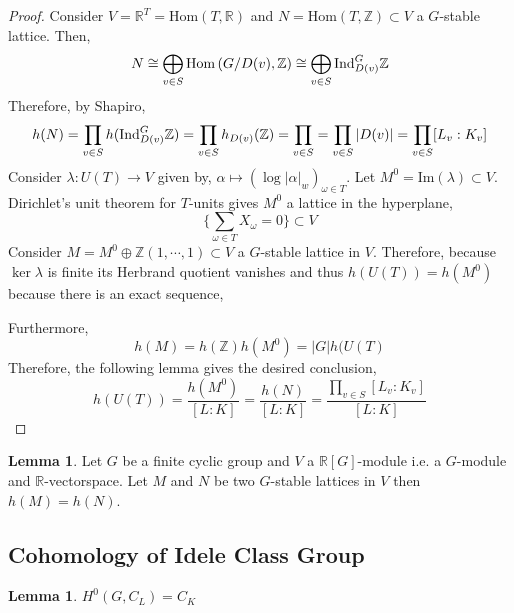 \documentclass[12pt]{extarticle}
\newcommand{\Z}{\mathbb{Z}}
\newcommand{\R}{\mathbb{R}}
\renewcommand{\Im}[1]{\mathrm{Im}(#1)}
\newcommand{\Hom}[2]{\mathrm{Hom}\left( #1, #2 \right)}
\theoremstyle{definition}
\newtheorem{lemma}[theorem]{Lemma}
\begin{document}
\begin{proof}
Consider $V = \R^T = \Hom{T}{\R}$ and $N = \Hom{T}{\Z} \subset V$ a $G$-stable lattice. Then,
\[ N \cong \bigoplus_{v \in S} \Hom{G/D(v)}{\Z} \cong \bigoplus_{v \in S} \Ind_{D(v)}^G \Z \]
Therefore, by Shapiro,
\[ h(N) = \prod_{v \in S} h(\Ind_{D(v)}^G \Z) = \prod_{v \in S} h_{D(v)}(\Z) = \prod_{v \in S} = \prod_{v \in S} |D(v)| = \prod_{v \in S} [L_v : K_v] \]
Consider $\lambda : U(T) \to V$ given by, $\alpha \mapsto (\log{|\alpha|_w} )_{\omega \in T}$. Let $M^0 = \Im{\lambda} \subset V$. Dirichlet's unit theorem for $T$-units gives $M^0$ a lattice in the hyperplane,
\[ \{ \sum_{\omega \in T} X_\omega = 0 \} \subset V \]
Consider $M = M^0 \oplus \Z (1,\cdots, 1) \subset V$ a $G$-stable lattice in $V$. Therefore, because $\ker{\lambda}$ is finite its Herbrand quotient vanishes and thus $h(U(T)) = h(M^0)$ because there is an exact sequence,
\begin{center}
\end{center}
Furthermore,
\[ h(M) = h(\Z) h(M^0) = |G| h(U(T) \]
Therefore, the following lemma gives the desired conclusion,
\[ h(U(T)) = \frac{h(M^0)}{[L : K]} = \frac{h(N)}{[L : K]} = \frac{\prod\limits_{v \in S} [L_v : K_v]}{[L : K]} \]
\end{proof}

\begin{lemma}
Let $G$ be a finite cyclic group and $V$ a $\R[G]$-module i.e. a $G$-module and $\R$-vectorspace. Let $M$ and $N$ be two $G$-stable lattices in $V$ then $h(M) = h(N)$. 
\end{lemma}

\subsection{Cohomology of Idele Class Group}

\begin{lemma}
$H^0(G, C_L) = C_K$
\end{lemma}
\end{document}
